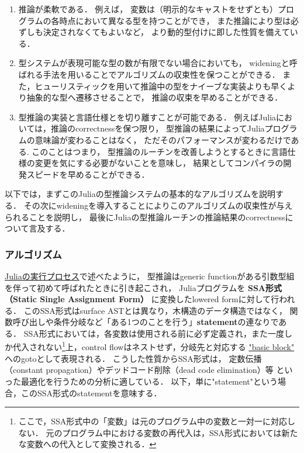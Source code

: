 \begin{enumerate}
  \item 推論が柔軟である．
        例えば，
        変数は（明示的なキャストをせずとも）プログラムの各時点において異なる型を持つことができ，
        また推論により型は必ずしも決定されなくてもよいなど，
        より動的型付けに即した性質を備えている．
  \item 型システムが表現可能な型の数が有限でない場合においても，
        wideningと呼ばれる手法を用いることでアルゴリズムの収束性を保つことができる．
        また，ヒューリスティックを用いて推論中の型をナイーブな実装よりも早くより抽象的な型へ遷移させることで，
        推論の収束を早めることができる．
  \item 型推論の実装と言語仕様とを切り離すことが可能である．
        例えばJuliaにおいては，推論のcorrectnessを保つ限り，
        型推論の結果によってJuliaプログラムの意味論が変わることはなく，
        ただそのパフォーマンスが変わるだけである.
        このことはつまり，
        型推論のルーチンを改善しようとするときに言語仕様の変更を気にする必要がないことを意味し，
        結果としてコンパイラの開発スピードを早めることができる．
\end{enumerate}

以下では，まずこのJuliaの型推論システムの基本的なアルゴリズムを説明する．
その次にwideningを導入することによりこのアルゴリズムの収束性が与えられることを説明し，
最後にJuliaの型推論ルーチンの推論結果のcorrectnessについて言及する．

\subsubsection{アルゴリズム} \label{subsubsection:inference-algorithm}

\hyperref[subsubsection:eval-process]{Juliaの実行プロセス}で述べたように，
型推論はgeneric functionがある引数型組を伴って初めて呼ばれたときに引き起こされ，
Juliaプログラムを
\textbf{SSA形式（Static Single Assignment Form）}\cite{julia-ssa}
に変換したlowered formに対して行われる．
このSSA形式はsurface ASTとは異なり，木構造のデータ構造ではなく，
関数呼び出しや条件分岐など「ある1つのことを行う」\textbf{statement}の連なりである．
SSA形式においては，各変数は使用される前に必ず定義され，また一度しか代入されない\footnote{
  ここで，SSA形式中の「変数」は元のプログラム中の変数と一対一に対応しない．
  元のプログラム中における変数の再代入は，SSA形式においては新たな変数への代入として変換される．
}上，control flowはネストせず，分岐先と対応する
\href{https://en.wikipedia.org/wiki/Basic_block}{"basic block"}
へのgotoとして表現される．
こうした性質からSSA形式は，
定数伝播（constant propagation）やデッドコード削除（dead code elimination）等
といった最適化を行うための分析に適している．
以下，単に"statement"という場合，このSSA形式のstatementを意味する．

